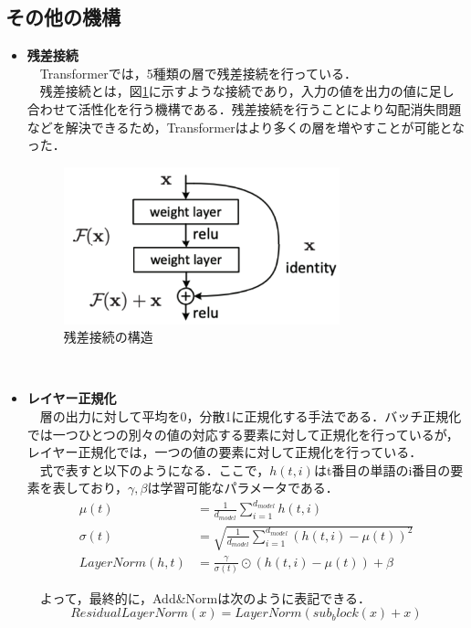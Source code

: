 \documentclass[a4j, 11pt]{jsarticle}
\numberwithin{equation}{section}
\begin{document}
\subsection{その他の機構}
\begin{itemize}
\item \textbf{残差接続}\\
　Transformerでは，5種類の層で残差接続を行っている．\\
　残差接続とは，図\ref{re}に示すような接続であり，入力の値を出力の値に足し合わせて活性化を行う機構である．残差接続を行うことにより勾配消失問題などを解決できるため，Transformerはより多くの層を増やすことが可能となった．
\begin{figure}[H]
\centering
\includegraphics[width=8cm]{residual.png}
\caption{残差接続の構造}
\label{re}
\end{figure}　


\item \textbf{レイヤー正規化}\\
　層の出力に対して平均を0，分散1に正規化する手法である．バッチ正規化では一つひとつの別々の値の対応する要素に対して正規化を行っているが，レイヤー正規化では，一つの値の要素に対して正規化を行っている．\\
　式で表すと以下のようになる．ここで，$h(t,i)$はt番目の単語のi番目の要素を表しており，$\gamma, \beta$は学習可能なパラメータである．
\begin{align}
\mu(t) &= \frac{1}{d_{model}}\sum_{i=1}^{d_{model}}h(t,i)\\
\sigma(t) &= \sqrt{\frac{1}{d_{model}}\sum_{i=1}^{d_{model}}(h(t,i)-\mu(t))^2}\\
LayerNorm(h, t) &= \frac{\gamma}{\sigma(t)}\odot(h(t,i)-\mu(t))+\beta
\end{align}
\vspace{10mm}


　よって，最終的に，Add\&Normは次のように表記できる．
\begin{equation}
　ResidualLayerNorm(x) = LayerNorm(sub_block(x)+x)
\end{equation}
\end{itemize} 
\end{document}
